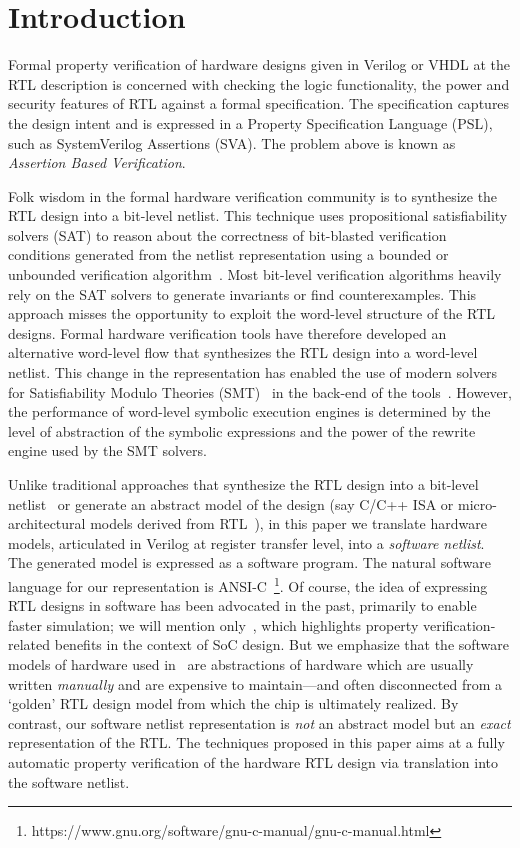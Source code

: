 \section{Introduction}\label{sec:intro}
%
Formal property verification of hardware designs given in Verilog or VHDL
at the RTL description is concerned with checking the logic functionality, 
the power and security features of RTL against a formal specification. The 
specification captures the design intent and is expressed in a Property 
Specification Language (PSL), such as SystemVerilog Assertions (SVA). The 
problem above is known as \emph{Assertion Based Verification}.


Folk wisdom in the formal hardware verification community is to synthesize the 
RTL design into a bit-level netlist.  This technique uses propositional 
satisfiability solvers (SAT) to reason about the correctness of bit-blasted 
verification conditions generated from the netlist representation using a 
bounded or unbounded verification algorithm~\cite{abc,vis,andreas}.  
Most bit-level verification algorithms heavily rely on the SAT solvers 
to generate invariants or find counterexamples. 
%
This approach misses the opportunity to exploit the word-level structure of 
the RTL designs.  Formal hardware verification tools have therefore developed 
an alternative word-level flow that synthesizes the RTL design into a word-level 
netlist.  This change in the representation has enabled the use of modern solvers 
for Satisfiability Modulo Theories (SMT)~\cite{decision_procedures} in the
back-end of the tools~\cite{DBLP:conf/lpar/AndrausLS08,soc-keating,
DBLP:conf/mtv/SunkariCVM07,DBLP:conf/cav/Bjesse08}.
%
However, the performance of word-level symbolic execution engines is 
determined by the level of abstraction of the symbolic expressions and 
the power of the rewrite engine used by the SMT solvers. 
%


Unlike traditional approaches that synthesize the RTL design into a bit-level
netlist~\cite{abc,fmcad07,vis} or generate an
abstract model of the design (say C/C++ ISA or micro-architectural
models derived from RTL~\cite{satrajit}), in this paper we translate 
hardware models, articulated in Verilog at register transfer level, into 
a \emph{software netlist}. 
%
The generated model is expressed as a software program. 
% 
The natural software language for our representation is 
ANSI-C~\footnote{https://www.gnu.org/software/gnu-c-manual/gnu-c-manual.html}.  
%
Of course, the idea of expressing RTL designs in software has been 
advocated in the past, primarily to enable faster simulation; we will 
mention only~\cite{soc-keating}, which highlights property 
verification-related benefits in the context of SoC design.  
%
But we emphasize that the software models of hardware used 
in~\cite{soc-keating} are abstractions of hardware which are 
usually written \emph{manually} and are expensive to maintain---and 
often disconnected from a `golden' RTL design model from which the chip 
is ultimately realized.  By contrast, our software netlist representation 
is \emph{not} an abstract model but an \emph{exact} representation 
of the RTL.  The techniques proposed in this paper aims at a 
fully automatic property verification of the hardware RTL design via 
translation into the software netlist.  
%


